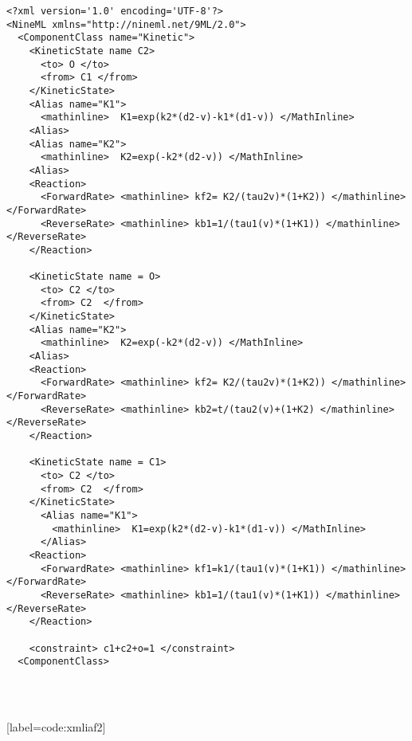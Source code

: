 \documentclass[draftspec]{ninemlspec}
\begin{document}
\begin{lstlisting}[label=code:xmliaf2]
<?xml version='1.0' encoding='UTF-8'?>
<NineML xmlns="http://nineml.net/9ML/2.0">
  <ComponentClass name="Kinetic">
    <KineticState name C2> 
      <to> O </to>
      <from> C1 </from>
    </KineticState>
    <Alias name="K1">    
      <mathinline>  K1=exp(k2*(d2-v)-k1*(d1-v)) </MathInline>
    <Alias>
    <Alias name="K2">    
  	  <mathinline>  K2=exp(-k2*(d2-v)) </MathInline>
    <Alias>    
    <Reaction>
      <ForwardRate> <mathinline> kf2= K2/(tau2v)*(1+K2)) </mathinline> </ForwardRate>
      <ReverseRate> <mathinline> kb1=1/(tau1(v)*(1+K1)) </mathinline>  </ReverseRate>      
    </Reaction>
  
    <KineticState name = O> 
      <to> C2 </to>
      <from> C2  </from>
    </KineticState>
    <Alias name="K2">    
  	  <mathinline>  K2=exp(-k2*(d2-v)) </MathInline>
    <Alias>       
    <Reaction>
      <ForwardRate> <mathinline> kf2= K2/(tau2v)*(1+K2)) </mathinline> </ForwardRate>
      <ReverseRate> <mathinline> kb2=t/(tau2(v)+(1+K2) </mathinline> </ReverseRate>
    </Reaction>
    
    <KineticState name = C1> 
      <to> C2 </to>
      <from> C2  </from>
    </KineticState>  
      <Alias name="K1">
	  	<mathinline>  K1=exp(k2*(d2-v)-k1*(d1-v)) </MathInline> 
  	  </Alias>	
    <Reaction>
      <ForwardRate> <mathinline> kf1=k1/(tau1(v)*(1+K1)) </mathinline>  </ForwardRate>
      <ReverseRate> <mathinline> kb1=1/(tau1(v)*(1+K1)) </mathinline>  </ReverseRate>
    </Reaction> 
     
    <constraint> c1+c2+o=1 </constraint>
  <ComponentClass>  
      
	  	
	   
\end{lstlisting}[label=code:xmliaf2]


\clearpage


\end{document}

